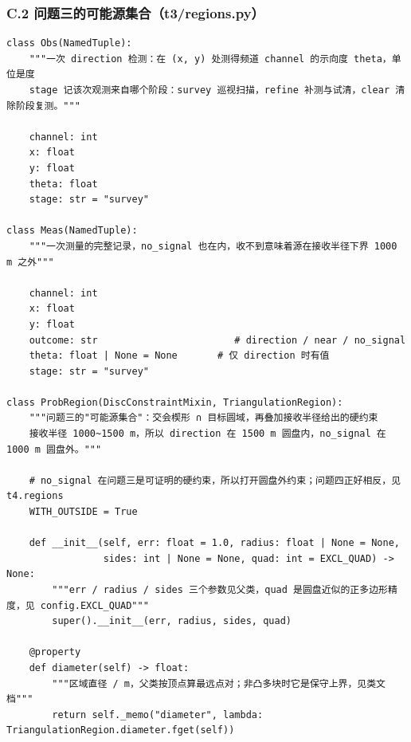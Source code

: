 \documentclass[UTF8, zihao=5,AutoFakeBold=2]{ctexart}
\begin{document}
	\subsubsection*{C.2 \quad 问题三的可能源集合（t3/regions.py）}
	\begin{lstlisting}
class Obs(NamedTuple):
    """一次 direction 检测：在 (x, y) 处测得频道 channel 的示向度 theta，单位是度
    stage 记该次观测来自哪个阶段：survey 巡视扫描，refine 补测与试清，clear 清除阶段复测。"""

    channel: int
    x: float
    y: float
    theta: float
    stage: str = "survey"

class Meas(NamedTuple):
    """一次测量的完整记录，no_signal 也在内，收不到意味着源在接收半径下界 1000 m 之外"""

    channel: int
    x: float
    y: float
    outcome: str                        # direction / near / no_signal
    theta: float | None = None       # 仅 direction 时有值
    stage: str = "survey"

class ProbRegion(DiscConstraintMixin, TriangulationRegion):
    """问题三的"可能源集合"：交会楔形 ∩ 目标圆域，再叠加接收半径给出的硬约束
    接收半径 1000~1500 m，所以 direction 在 1500 m 圆盘内，no_signal 在 1000 m 圆盘外。"""

    # no_signal 在问题三是可证明的硬约束，所以打开圆盘外约束；问题四正好相反，见 t4.regions
    WITH_OUTSIDE = True

    def __init__(self, err: float = 1.0, radius: float | None = None,
                 sides: int | None = None, quad: int = EXCL_QUAD) -> None:
        """err / radius / sides 三个参数见父类，quad 是圆盘近似的正多边形精度，见 config.EXCL_QUAD"""
        super().__init__(err, radius, sides, quad)

    @property
    def diameter(self) -> float:
        """区域直径 / m，父类按顶点算最远点对；非凸多块时它是保守上界，见类文档"""
        return self._memo("diameter", lambda: TriangulationRegion.diameter.fget(self))
	\end{lstlisting}
\end{document}
